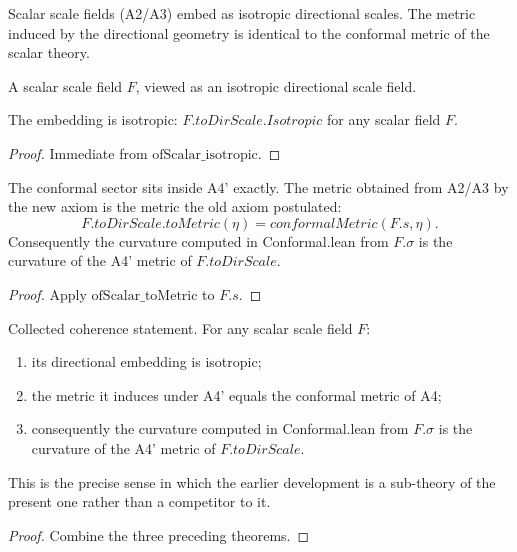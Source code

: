 Scalar scale fields (A2/A3) embed as isotropic directional scales. The metric induced by the directional geometry is identical to the conformal metric of the scalar theory.

\begin{definition}
A scalar scale field $F$, viewed as an isotropic directional scale field. 
\end{definition}

\begin{theorem}
The embedding is isotropic: $F.toDirScale.Isotropic$ for any scalar field $F$. 
\end{theorem}

\begin{proof}
Immediate from $\text{ofScalar\_isotropic}$.
\end{proof}

\begin{theorem}
The conformal sector sits inside A4' exactly. The metric obtained from A2/A3 by the new axiom is the metric the old axiom postulated:
$$F.toDirScale.toMetric(\eta) = conformalMetric(F.s, \eta).$$
Consequently the curvature computed in Conformal.lean from $F.\sigma$ is the curvature of the A4' metric of $F.toDirScale$. 
\end{theorem}

\begin{proof}
Apply $\text{ofScalar\_toMetric}$ to $F.s$.
\end{proof}

\begin{theorem}
Collected coherence statement. For any scalar scale field $F$:
\begin{enumerate}
\item its directional embedding is isotropic;
\item the metric it induces under A4' equals the conformal metric of A4;
\item consequently the curvature computed in Conformal.lean from $F.\sigma$ is the curvature of the A4' metric of $F.toDirScale$.
\end{enumerate}
This is the precise sense in which the earlier development is a sub-theory of the present one rather than a competitor to it. 
\end{theorem}

\begin{proof}
Combine the three preceding theorems.
\end{proof}

